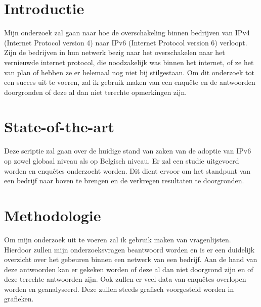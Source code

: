 
\section{Introductie} %
\label{sec:introductie}

Mijn onderzoek zal gaan naar hoe de overschakeling binnen bedrijven van IPv4 (Internet Protocol version 4) naar IPv6 (Internet Protocol version 6) verloopt. Zijn de bedrijven in hun netwerk bezig naar het overschakelen naar het vernieuwde internet protocol, die noodzakelijk was binnen het internet, of ze het van plan of hebben ze er helemaal nog niet bij stilgestaan. Om dit onderzoek tot een succes uit te voeren, zal ik gebruik maken van een enquête en de antwoorden doorgronden of deze al dan niet terechte opmerkingen zijn.


\section{State-of-the-art}
\label{sec:state-of-the-art}

Deze scriptie zal gaan over de huidige stand van zaken van de adoptie van IPv6 op zowel globaal niveau als op Belgisch niveau. Er zal een studie uitgevoerd worden en enquêtes onderzocht worden. Dit dient ervoor om het standpunt van een bedrijf naar boven te brengen en de verkregen resultaten te doorgronden. 



\section{Methodologie}
\label{sec:methodologie}

Om mijn onderzoek uit te voeren zal ik gebruik maken van vragenlijsten. Hierdoor zullen mijn onderzoeksvragen beantwoord worden en is er een duidelijk overzicht over het gebeuren binnen een netwerk van een bedrijf. Aan de hand van deze antwoorden kan er gekeken worden of deze al dan niet doorgrond zijn en of deze terechte antwoorden zijn. Ook zullen er veel data van enquêtes overlopen worden en geanalyseerd. Deze zullen steeds grafisch voorgesteld worden in grafieken. 


